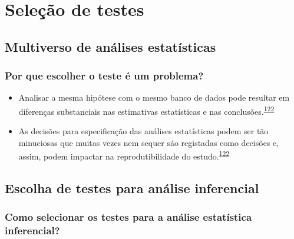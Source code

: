 \documentclass[
  a4paper,
]{book}
\begin{document}
\hypertarget{selecao-testes}{%
\chapter{\texorpdfstring{\textbf{Seleção de testes}}{Seleção de testes}}\label{selecao-testes}}

\hypertarget{multiverso-estatistica}{%
\section{Multiverso de análises estatísticas}\label{multiverso-estatistica}}

\hypertarget{por-que-escolher-o-teste-uxe9-um-problema}{%
\subsection{Por que escolher o teste é um problema?}\label{por-que-escolher-o-teste-uxe9-um-problema}}

\begin{itemize}
\item
  Analisar a mesma hipótese com o mesmo banco de dados pode resultar em diferenças substanciais nas estimativas estatísticas e nas conclusões.\textsuperscript{\protect\hyperlink{ref-Breznau2022}{122}}
\item
  As decisões para especificação das análises estatísticas podem ser tão minuciosas que muitas vezes nem sequer são registadas como decisões e, assim, podem impactar na reprodutibilidade do estudo.\textsuperscript{\protect\hyperlink{ref-Breznau2022}{122}}
\end{itemize}

\hypertarget{escolha-analise-inferencial}{%
\section{Escolha de testes para análise inferencial}\label{escolha-analise-inferencial}}

\hypertarget{como-selecionar-os-testes-para-a-anuxe1lise-estatuxedstica-inferencial}{%
\subsection{Como selecionar os testes para a análise estatística inferencial?}\label{como-selecionar-os-testes-para-a-anuxe1lise-estatuxedstica-inferencial}}
\end{document}

